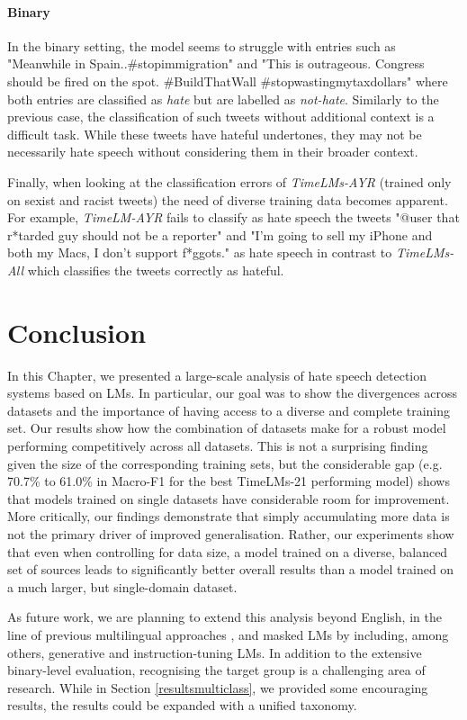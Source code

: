 \paragraph{Binary}
In the binary setting, the model seems to struggle with entries such as "Meanwhile in Spain..\#stopimmigration" and "This is outrageous. Congress should be fired on the spot. \#BuildThatWall \#stopwastingmytaxdollars" where both entries are classified as \textit{hate} but are labelled as \textit{not-hate}. Similarly to the previous case, the classification of such tweets without additional context is a difficult task. While these tweets have hateful undertones, they may not be necessarily hate speech without considering them in their broader context.

Finally, when looking at the classification errors of \textit{TimeLMs-AYR} (trained only on sexist and racist tweets) the need of diverse training data becomes apparent. For example, \textit{TimeLM-AYR} fails to classify as hate speech the tweets "@user that r*tarded guy should not be a reporter" and "I'm going to sell my iPhone and both my Macs, I don't support f*ggots." as hate speech in contrast to \textit{TimeLMs-All} which classifies the tweets correctly as hateful.

\section{Conclusion}
In this Chapter, we presented a large-scale analysis of hate speech detection systems based on \acp{LM}. In particular, our goal was to show the divergences across datasets and the importance of having access to a diverse and complete training set. Our results show how the combination of datasets make for a robust model performing competitively across all datasets. This is not a surprising finding given the size of the corresponding training sets, but the considerable gap (e.g. 70.7\% to 61.0\% in Macro-F1 for the best TimeLMs-21 performing model) shows that models trained on single datasets have considerable room for improvement. More critically, our findings demonstrate that simply accumulating more data is not the primary driver of improved generalisation. Rather, our experiments show that even when controlling for data size, a model trained on a diverse, balanced set of sources leads to significantly better overall results than a model trained on a much larger, but single-domain dataset.

As future work, we are planning to extend this analysis beyond English, in the line of previous multilingual approaches \cite{ousidhoum-etal-2019-multilingual,chiril-etal-2019-multilingual,bigoulaeva-etal-2021-cross}, and masked \acp{LM} by including, among others, generative and instruction-tuning \acp{LM}. In addition to the extensive binary-level evaluation, recognising the target group is a challenging area of research. While in Section \ref{resultsmulticlass}, we provided some encouraging results, the results could be expanded with a unified taxonomy.

